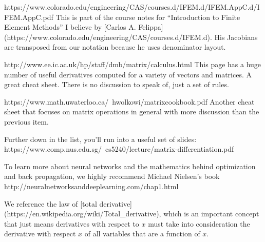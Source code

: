 \documentclass[11pt]{article}
\begin{document}
https://www.colorado.edu/engineering/CAS/courses.d/IFEM.d/IFEM.AppC.d/IFEM.AppC.pdf This is part of the course notes for ``Introduction to Finite Element Methods'' I believe by [Carlos A. Felippa](https://www.colorado.edu/engineering/CAS/courses.d/IFEM.d).  His Jacobians are transposed from our notation because he uses denominator layout.

http://www.ee.ic.ac.uk/hp/staff/dmb/matrix/calculus.html  This page has a huge number of useful derivatives computed for a variety of vectors and matrices. A great cheat sheet. There is no discussion to speak of, just a set of rules.

https://www.math.uwaterloo.ca/~hwolkowi/matrixcookbook.pdf Another cheat sheet that focuses on matrix operations in general with more discussion than the previous item.

Further down in the list, you'll run into a useful set of slides:  https://www.comp.nus.edu.sg/~cs5240/lecture/matrix-differentiation.pdf

To learn more about neural networks and the mathematics behind optimization and back propagation, we highly recommend Michael Nielsen's book http://neuralnetworksanddeeplearning.com/chap1.html

We reference the law of [total derivative](https://en.wikipedia.org/wiki/Total\_derivative), which is an important concept that just means derivatives with respect to $x$ must take into consideration the derivative with respect $x$ of all variables that are a function of $x$.
\end{document}
